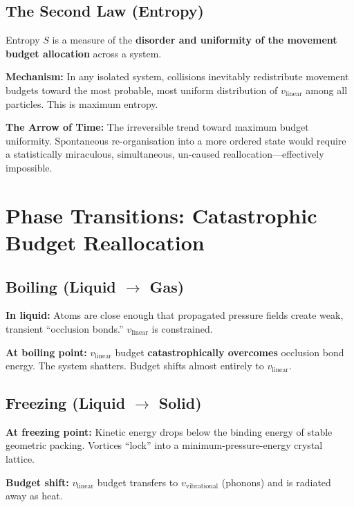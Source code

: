 \subsection{The Second Law (Entropy)}

Entropy $S$ is a measure of the \textbf{disorder and uniformity of the movement budget allocation} across a system.

\textbf{Mechanism:} In any isolated system, collisions inevitably redistribute movement budgets toward the most probable, most uniform distribution of $v_{\text{linear}}$ among all particles.  This is maximum entropy.

\textbf{The Arrow of Time:} The irreversible trend toward maximum budget uniformity.  Spontaneous re-organisation into a more ordered state would require a statistically miraculous, simultaneous, un-caused reallocation---effectively impossible.


\section{Phase Transitions: Catastrophic Budget Reallocation}

\subsection{Boiling (Liquid $\to$ Gas)}

\textbf{In liquid:} Atoms are close enough that propagated pressure fields create weak, transient ``occlusion bonds.''  $v_{\text{linear}}$ is constrained.

\textbf{At boiling point:} $v_{\text{linear}}$ budget \textbf{catastrophically overcomes} occlusion bond energy.  The system shatters.  Budget shifts almost entirely to $v_{\text{linear}}$.

\subsection{Freezing (Liquid $\to$ Solid)}

\textbf{At freezing point:} Kinetic energy drops below the binding energy of stable geometric packing.  Vortices ``lock'' into a minimum-pressure-energy crystal lattice.

\textbf{Budget shift:} $v_{\text{linear}}$ budget transfers to $v_{\text{vibrational}}$ (phonons) and is radiated away as heat.


